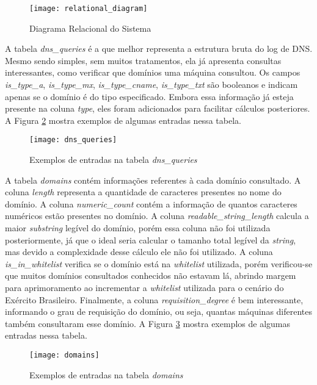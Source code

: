 \begin{figure}
\texttt{[image: relational\_diagram]}
\caption[Diagrama Relacional do Sistema]{Diagrama Relacional do Sistema} \label{fig:relational_diagram}
\end{figure}

A tabela \textit{dns\_queries} é a que melhor representa a estrutura bruta do log de DNS. Mesmo sendo simples, sem muitos tratamentos, ela já apresenta consultas interessantes, como verificar que domínios uma máquina consultou. Os campos \textit{is\_type\_a}, \textit{is\_type\_mx}, \textit{is\_type\_cname}, \textit{is\_type\_txt} são booleanos e indicam apenas se o domínio é do tipo especificado. Embora essa informação já esteja presente na coluna \textit{type}, eles foram adicionados para facilitar cálculos posteriores. A Figura \ref{fig:dns_queries} mostra exemplos de algumas entradas nessa tabela.

\begin{figure}
\texttt{[image: dns\_queries]}
\caption[Exemplos de entradas na tabela \textit{dns\_queries}]{Exemplos de entradas na tabela \textit{dns\_queries}} \label{fig:dns_queries}
\end{figure}

A tabela \textit{domains} contém informações referentes à cada domínio consultado. A coluna \textit{length} representa a quantidade de caracteres presentes no nome do domínio. A coluna \textit{numeric\_count} contém a informação de quantos caracteres numéricos estão presentes no domínio. A coluna \textit{readable\_string\_length} calcula a maior \textit{substring} legível do domínio, porém essa coluna não foi utilizada posteriormente, já que o ideal seria calcular o tamanho total legível da \textit{string}, mas devido a complexidade desse cálculo  ele não foi utilizado. A coluna \textit{is\_in\_whitelist} verifica se o domínio está na \textit{whitelist} utilizada, porém verificou-se que muitos domínios consultados conhecidos não estavam lá, abrindo margem para aprimoramento ao incrementar a \textit{whitelist} utilizada para o cenário do Exército Brasileiro. Finalmente, a coluna \textit{requisition\_degree} é bem interessante, informando o grau de requisição do domínio, ou seja, quantas máquinas diferentes também consultaram esse domínio. A Figura \ref{fig:domains} mostra exemplos de algumas entradas nessa tabela.

\begin{figure}
\texttt{[image: domains]}
\caption[Exemplos de entradas na tabela \textit{domains}]{Exemplos de entradas na tabela \textit{domains}} \label{fig:domains}
\end{figure}

